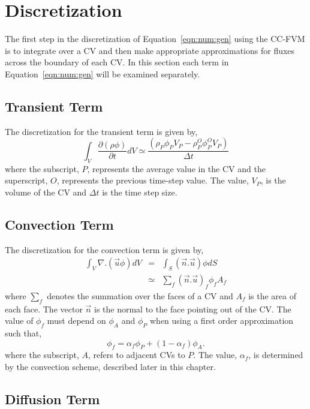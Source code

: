 \section{Discretization}

The first step in the discretization of Equation~\eqref{eqn:num:gen}
using the CC-FVM is to integrate over a CV and then make appropriate
approximations for fluxes across the boundary of each CV.  In this
section each term in Equation~\eqref{eqn:num:gen} will be examined
separately.

\subsection{Transient Term}

The discretization for the transient term is given by,
\begin{equation}
\int_V \frac{\partial (\rho \phi)}{\partial t} dV
\simeq
\frac{(\rho_{P} \phi_{P} V_P- \rho_P^O \phi_P^O V_P)}{\Delta t}
\label{eqn:num:tra}
\end{equation}
where the subscript, $P$, represents the average value in the CV and
the superscript, $O$, represents the previous time-step value.  The
value, $V_P$, is the volume of the CV and $\Delta t$ is the time step
size.

\subsection{Convection Term}

The discretization for the convection term is given by,
\begin{eqnarray}
\int_V \nabla.(\vec{u} \phi) dV & = & \int_S (\vec{n}.\vec{u})\phi dS \\
& \simeq & \sum_{f} (\vec{n}.\vec{u})_f \phi_f A_f
\label{eqn:num:con}
\end{eqnarray}
where $\sum_{f}$ denotes the summation over the faces of a CV and
$A_f$ is the area of each face.  The vector $\vec{n}$ is the normal to
the face pointing out of the CV. The value of $\phi_f$ must depend on
$\phi_A$ and $\phi_P$ when using a first order approximation such
that,
\begin{equation}
\phi_f=\alpha_f \phi_P +(1-\alpha_f)\phi_A.
\end{equation}
where the subscript, $A$, refers to adjacent CVs to $P$. The value,
$\alpha_f$, is determined by the convection scheme, described later in
this chapter.

\subsection{Diffusion Term}

